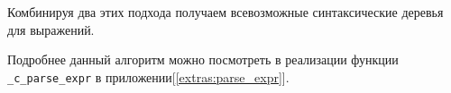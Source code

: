 \FloatBarrier


Комбинируя два этих подхода получаем всевозможные синтаксические деревья для выражений.

Подробнее данный алгоритм можно посмотреть в реализации функции \verb|_c_parse_expr| в приложении[\ref{extras:parse_expr}].












